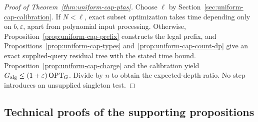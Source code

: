 \begin{proof}[Proof of Theorem~\ref{thm:uniform-cap-ptas}]
Choose $\ell$ by Section~\ref{sec:uniform-cap-calibration}.
If $N<\ell$, exact subset optimization takes time depending only on
$b,\varepsilon$, apart from polynomial input processing. Otherwise,
Proposition~\ref{prop:uniform-cap-prefix} constructs the legal prefix,
and Propositions~\ref{prop:uniform-cap-types}
and~\ref{prop:uniform-cap-count-dp} give an exact supplied-query
residual tree with the stated time bound.
Proposition~\ref{prop:uniform-cap-charge} and the calibration yield
$G_{\rm alg}\le(1+\varepsilon)\operatorname{OPT}_G$. Divide by $n$ to obtain the
expected-depth ratio. No step introduces an unsupplied singleton test.
\end{proof}

\subsection{Technical proofs of the supporting propositions}


